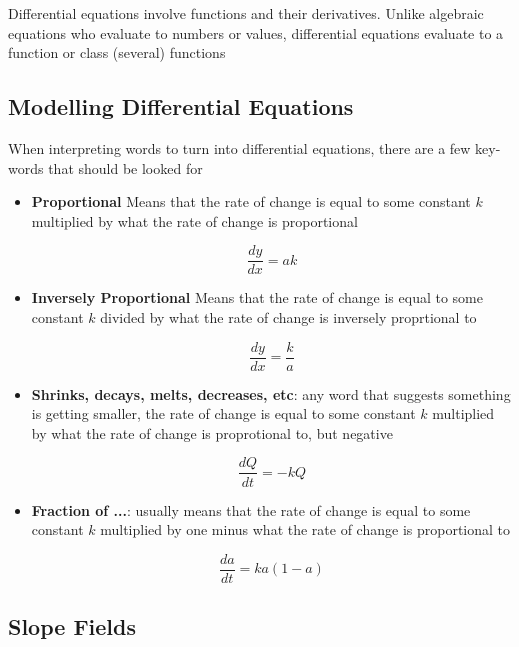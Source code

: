 \documentclass[12pt]{article}
\begin{document}
        Differential equations involve functions and their derivatives. Unlike algebraic equations
        who evaluate to numbers or values, differential equations evaluate to a function or class 
        (several) functions

        \subsection{Modelling Differential Equations}

        When interpreting words to turn into differential equations, there are a few
        key-words that should be looked for

        \begin{itemize}
            
            \item \textbf{Proportional} Means that the rate of change is equal to some constant
                  $k$ multiplied by what the rate of change is proportional

            \[
                \frac{dy}{dx} = ak
            \]

            \item \textbf{Inversely Proportional} Means that the rate of change is equal to some 
                 constant $k$ divided by what the rate of change is inversely proprtional to
            
            \[
                \frac{dy}{dx} = \frac{k}{a}    
            \]

            \item \textbf{Shrinks, decays, melts, decreases, etc}: any word that suggests something is 
                  getting smaller, the rate of change is equal to some constant $k$ multiplied by what
                  the rate of change is proprotional to, but negative

                  \[
                    \frac{dQ}{dt} = -kQ  
                  \]

            \item \textbf{Fraction of ...}: usually means that the rate of change is equal to some 
                  constant $k$ multiplied by one minus what the rate of change is proportional to

                  \[
                        \frac{da}{dt} = ka(1 - a)  
                  \]

        \end{itemize}

        \subsection{Slope Fields}
\end{document}
